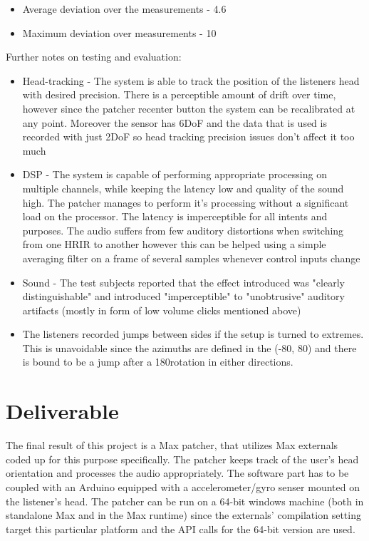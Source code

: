 \documentclass[a4paper,12pt,oneside]{article}
\begin{document}
\begin{itemize}
\begin {center}
\begin {itemize}

\item Average deviation over the  measurements - 4.6\degree 
\item Maximum deviation over measurements - 10\degree 
\end{itemize}
\end {center}

\end{itemize}

Further notes on testing and evaluation:
\begin{itemize}
\item Head-tracking - The system is able to track the position of the listeners head with desired precision. There is a perceptible amount of drift over time, however since the patcher recenter button the system can be recalibrated at any point. Moreover the sensor has 6DoF and the data that is used is recorded with just 2DoF so head tracking precision issues don't affect it too much
\item DSP - The system is capable of performing appropriate processing on multiple channels, while keeping the latency low and quality of the sound high. The patcher manages to perform it's processing without a significant load on the processor. The latency is imperceptible for all intents and purposes. The audio suffers from few auditory distortions when switching from one HRIR to another however this can be helped using a simple averaging filter on a frame of several samples whenever control inputs change
\item Sound - The test subjects reported that the effect introduced was "clearly distinguishable" and introduced "imperceptible" to "unobtrusive" auditory artifacts (mostly in form of low volume clicks mentioned above)
\item The listeners recorded jumps between sides if the setup is turned to extremes. This is unavoidable since the azimuths are defined in the (-80, 80) and there is bound to be a jump after a 180\degree rotation in either directions.
\end{itemize}

\section{Deliverable}

The final result of this project is a Max patcher, that utilizes Max externals coded up for this purpose specifically. The patcher keeps track of the user's head orientation and processes the audio appropriately. The software part has to be coupled with an Arduino equipped with a accelerometer/gyro senser mounted on the listener's head. The patcher can be run on a 64-bit windows machine (both in standalone Max and in the Max runtime) since the externals' compilation setting target this particular platform and the API calls for the 64-bit version are used.
\end{document}
